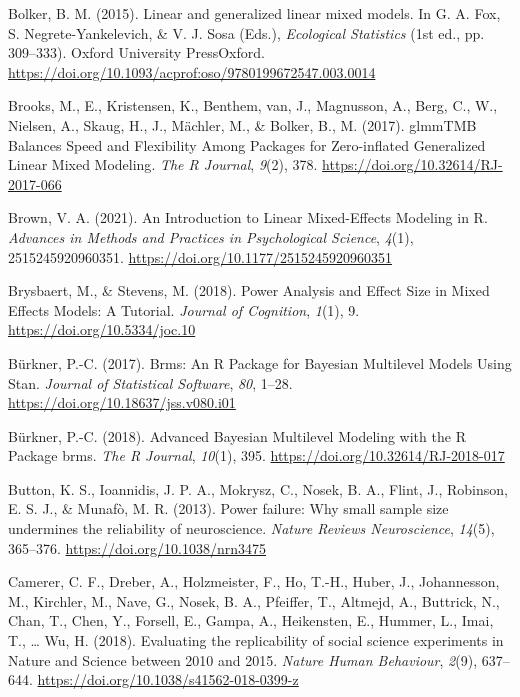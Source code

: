 \documentclass[
  man,
  floatsintext,
  longtable,
  a4paper,
  nolmodern,
  notxfonts,
  notimes,
  colorlinks=true,linkcolor=blue,citecolor=blue,urlcolor=blue]{apa7}
\newlength{\cslhangindent}
\newenvironment{CSLReferences}[2] %
 {\begin{list}{}{%
  \setlength{\itemindent}{0pt}
  \setlength{\leftmargin}{0pt}
  \setlength{\parsep}{0pt}
  \ifodd #1
   \setlength{\leftmargin}{\cslhangindent}
   \setlength{\itemindent}{-1\cslhangindent}
  \fi
  \setlength{\itemsep}{#2\baselineskip}}}
 {\end{list}}
\begin{document}
\begin{CSLReferences}{1}{0}
Bolker, B. M. (2015). Linear and generalized linear mixed models. In G.
A. Fox, S. Negrete-Yankelevich, \& V. J. Sosa (Eds.), \emph{Ecological
{Statistics}} (1st ed., pp. 309--333). Oxford University PressOxford.
\url{https://doi.org/10.1093/acprof:oso/9780199672547.003.0014}

Brooks, M., E., Kristensen, K., Benthem, van, J., Magnusson, A., Berg,
C., W., Nielsen, A., Skaug, H., J., Mächler, M., \& Bolker, B., M.
(2017). {glmmTMB Balances Speed} and {Flexibility Among Packages} for
{Zero-inflated Generalized Linear Mixed Modeling}. \emph{The R Journal},
\emph{9}(2), 378. \url{https://doi.org/10.32614/RJ-2017-066}

Brown, V. A. (2021). An {Introduction} to {Linear Mixed-Effects
Modeling} in {R}. \emph{Advances in Methods and Practices in
Psychological Science}, \emph{4}(1), 2515245920960351.
\url{https://doi.org/10.1177/2515245920960351}

Brysbaert, M., \& Stevens, M. (2018). Power {Analysis} and {Effect Size}
in {Mixed Effects Models}: {A Tutorial}. \emph{Journal of Cognition},
\emph{1}(1), 9. \url{https://doi.org/10.5334/joc.10}

Bürkner, P.-C. (2017). Brms: {An R Package} for {Bayesian Multilevel
Models Using Stan}. \emph{Journal of Statistical Software}, \emph{80},
1--28. \url{https://doi.org/10.18637/jss.v080.i01}

Bürkner, P.-C. (2018). Advanced {Bayesian Multilevel Modeling} with the
{R Package} brms. \emph{The R Journal}, \emph{10}(1), 395.
\url{https://doi.org/10.32614/RJ-2018-017}

Button, K. S., Ioannidis, J. P. A., Mokrysz, C., Nosek, B. A., Flint,
J., Robinson, E. S. J., \& Munafò, M. R. (2013). Power failure: Why
small sample size undermines the reliability of neuroscience.
\emph{Nature Reviews Neuroscience}, \emph{14}(5), 365--376.
\url{https://doi.org/10.1038/nrn3475}

Camerer, C. F., Dreber, A., Holzmeister, F., Ho, T.-H., Huber, J.,
Johannesson, M., Kirchler, M., Nave, G., Nosek, B. A., Pfeiffer, T.,
Altmejd, A., Buttrick, N., Chan, T., Chen, Y., Forsell, E., Gampa, A.,
Heikensten, E., Hummer, L., Imai, T., \ldots{} Wu, H. (2018). Evaluating
the replicability of social science experiments in {Nature} and
{Science} between 2010 and 2015. \emph{Nature Human Behaviour},
\emph{2}(9), 637--644. \url{https://doi.org/10.1038/s41562-018-0399-z}


\end{CSLReferences}
\end{document}
